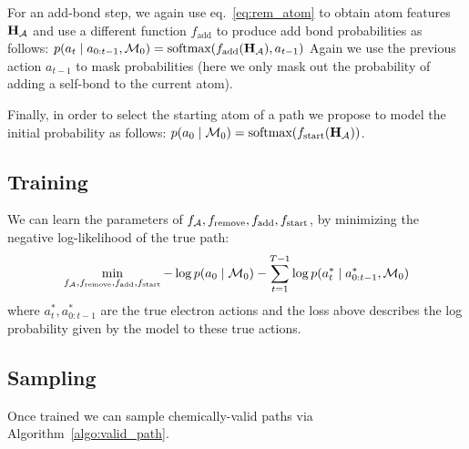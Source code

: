 For an add-bond step, we again use eq.~\eqref{eq:rem_atom} to obtain atom features ${\mathbf{H}}_{{\mathcal{A}}}$ and use a different function $f_{\textrm{add}}$ to produce add bond probabilities as follows: $p(a_t \mid a_{0:t-1}, {\mathcal{M}}_0) = \mbox{softmax}(f_{\textrm{add}}({\mathbf{H}}_{{\mathcal{A}}}), a_{t-1})$
Again we use the previous action $a_{t-1}$ to mask probabilities (here we only mask out the probability of adding a self-bond to the current atom).

Finally, in order to select the starting atom of a path we propose to model the initial probability as follows: $p(a_{0} \mid {\mathcal{M}}_0) = \mbox{softmax}(f_{\textrm{start}}({\mathbf{H}}_{{\mathcal{A}}}))$.

\subsection{Training}
We can learn the parameters of $f_{{\mathcal{A}}},f_{\textrm{remove}},f_{\textrm{add}},f_{\textrm{start}}$, by minimizing the negative log-likelihood of the true path:
\begin{align}
\min_{f_{{\mathcal{A}}},f_{\textrm{remove}},f_{\textrm{add}},f_{\textrm{start}}} - \log p(a_0 \mid {\mathcal{M}}_0) - \sum_{t=1}^{T-1} \log p(a_t^* \mid a_{0:t-1}^*, {\mathcal{M}}_0) \nonumber
\end{align}
where $a_t^*,a_{0:t-1}^*$ are the true electron actions and the loss above describes the log probability given by the model to these true actions.

\subsection{Sampling}
Once trained we can sample chemically-valid paths via Algorithm~\ref{algo:valid_path}. 



